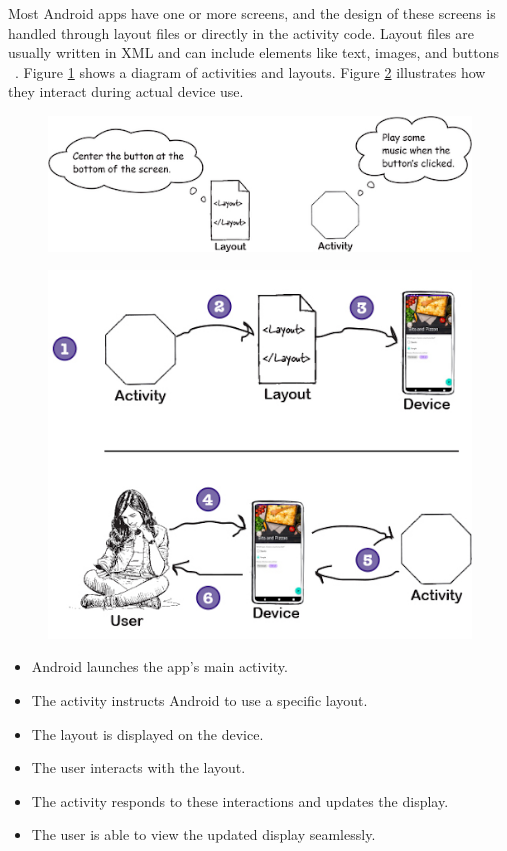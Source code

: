Most Android apps have one or more screens, and the design of these screens is handled through layout files or directly in the activity code. Layout files are usually written in XML and can include elements like text, images, and buttons ~\cite{headfirstandroid}. Figure \ref{fig:activitylayout} shows a diagram of activities and layouts. Figure \ref{fig:activitylayoutprocess} illustrates how they interact during actual device use.
\begin{figure}[H]
	\centering
	\includegraphics[scale=0.65]{activity_layout.png}
	\caption{}
	\label{fig:activitylayout}
\end{figure}
\begin{figure}[H]
	\centering
	\includegraphics[scale=0.35]{activity_layout_process}
	\caption{}
	\label{fig:activitylayoutprocess}
\end{figure}

\begin{itemize} 
	\item Android launches the app’s main activity.
	\item The activity instructs Android to use a specific layout.
	\item The layout is displayed on the device.
	\item The user interacts with the layout.
	\item The activity responds to these interactions and updates the display.
	\item The user is able to view the updated display seamlessly.
\end{itemize}

